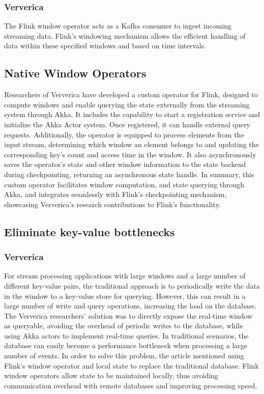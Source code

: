 \documentclass[runningheads]{llncs}
\begin{document}
\subsubsection{Ververica}
The Flink window operator acts as a Kafka consumer to ingest incoming streaming data. 
Flink's windowing mechanism allows the efficient handling of data within these specified 
windows and based on time intervals.

\subsection{Native Window Operators}
Researchers of Ververica have developed a custom operator for Flink, designed to compute windows
and enable querying the state externally from the streaming system through Akka. 
It includes the capability to start a registration service and initialize the Akka Actor system.
Once registered, it can handle external query requests. 
%
Additionally, the operator is equipped to process elements from the input stream, 
determining which window an element belongs to and updating the corresponding key's count and access time in the window.
It also asynchronously saves the operator's state and other window information to the state backend during checkpointing,
returning an asynchronous state handle. In summary, this custom operator facilitates window computation, 
and state querying through Akka, and integrates seamlessly with Flink's checkpointing mechanism, 
showcasing Ververica's research contributions to Flink's functionality.
\subsection{Eliminate key-value bottlenecks}
\subsubsection{Ververica}
%
For stream processing applications with large windows and a large number of different key-value pairs, 
the traditional approach is to periodically write the data in the window to a key-value store for querying. 
However, this can result in a large number of write and query operations, increasing the load on the database. 
The Ververica researchers' solution was to directly expose the real-time window as queryable, 
avoiding the overhead of periodic writes to the database, while using Akka actors to implement real-time queries. 
%
In traditional scenarios, the database can easily become a performance bottleneck when processing 
a large number of events. In order to solve this problem, the article mentioned using Flink's window operator 
and local state to replace the traditional database. Flink window operators allow state to be maintained locally, 
thus avoiding communication overhead with remote databases and improving processing speed.
\end{document}
